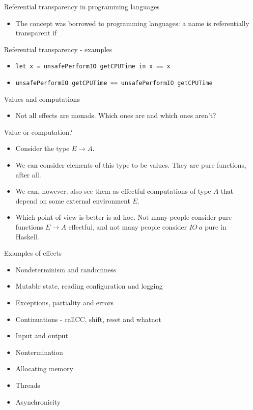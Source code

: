 \documentclass{beamer}
\begin{document}
\begin{frame}{Referential transparency in programming languages}
\begin{itemize}
	\item The concept was borrowed to programming languages: a name is referentially transparent if 
\end{itemize}
\end{frame}


\begin{frame}{Referential transparency - examples}
\begin{itemize}
	\item \texttt{let x = unsafePerformIO getCPUTime in x == x}
	\item \texttt{unsafePerformIO getCPUTime == unsafePerformIO getCPUTime}
\end{itemize}
\end{frame}

\begin{frame}{Values and computations}
\begin{itemize}
	\item Not all effects are monads. Which ones are and which ones aren't?
\end{itemize}
\end{frame}

\begin{frame}{Value or computation?}
\begin{itemize}
	\item Consider the type $E \to A$.
	\item We can consider elements of this type to be values. They are pure functions, after all.
	\item We can, however, also see them as effectful computations of type $A$ that depend on some external environment $E$.
	\item Which point of view is better is ad hoc. Not many people consider pure functions $E \to A$ effectful, and not many people consider $IO\ a$ pure in Haskell.
\end{itemize}
\end{frame}

\begin{frame}{Examples of effects}
\begin{itemize}
	\item Nondeterminism and randomness
	\item Mutable state, reading configuration and logging
	\item Exceptions, partiality and errors
	\item Continuations - callCC, shift, reset and whatnot
	\item Input and output
	\item Nontermination
	\item Allocating memory
	\item Threads
	\item Asynchronicity
\end{itemize}
\end{frame}
\end{document}

